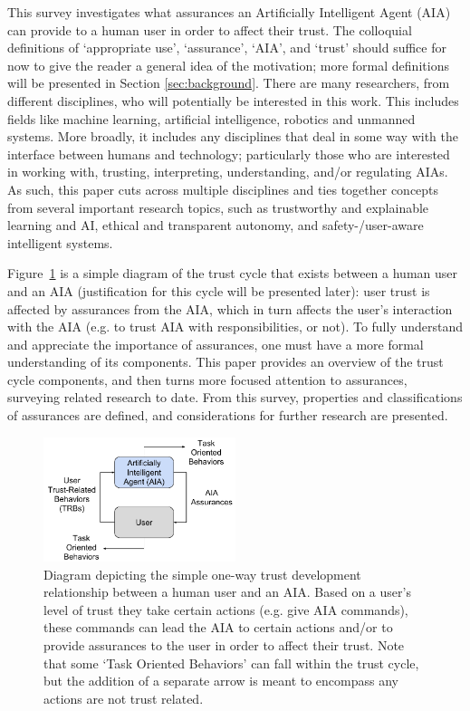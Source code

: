 This survey investigates what assurances an Artificially Intelligent Agent (AIA) can provide to a human user in order to affect their trust. The colloquial definitions of `appropriate use', `assurance', `AIA', and `trust' should suffice for now to give the reader a general idea of the motivation; more formal definitions will be presented in Section \ref{sec:background}. There are many researchers, from different disciplines, who will potentially be interested in this work. This includes fields like machine learning, artificial intelligence, robotics and unmanned systems. More broadly, it includes any disciplines that deal in some way with the interface between humans and technology; particularly those who are interested in working with, trusting, interpreting, understanding, and/or regulating AIAs. As such, this paper cuts across multiple disciplines and ties together concepts from several important research topics, such as trustworthy and explainable learning and AI, ethical and transparent autonomy, and safety-/user-aware intelligent systems.

Figure~\ref{fig:SimpleTrust_one_way} is a simple diagram of the trust cycle that exists between a human user and an AIA (justification for this cycle will be presented later): user trust is affected by assurances from the AIA, which in turn affects the user's interaction with the AIA (e.g. to trust AIA with responsibilities, or not). To fully understand and appreciate the importance of assurances, one must have a more formal understanding of its components. This paper provides an overview of the trust cycle components, and then turns more focused attention to assurances, surveying related research to date. From this survey, properties and classifications of assurances are defined, and considerations for further research are presented.

\begin{figure}
    \centering
    \includegraphics[width=0.5\textwidth]{Figures/SimpleTrust_one_way}
    \caption{Diagram depicting the simple one-way trust development relationship between a human user and an AIA. Based on a user's level of trust they take certain actions (e.g. give AIA commands), these commands can lead the AIA to certain actions and/or to provide assurances to the user in order to affect their trust. Note that some `Task Oriented Behaviors' can fall within the trust cycle, but the addition of a separate arrow is meant to encompass any actions are not trust related.}
    \label{fig:SimpleTrust_one_way}
\end{figure}

